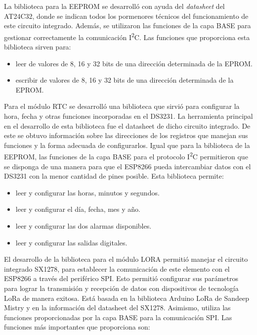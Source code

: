 La biblioteca para la EEPROM se desarrolló con ayuda del \textit{datasheet} \citep{WEBSITE:24} del AT24C32, donde se indican todos los pormenores técnicos del funcionamiento de este circuito integrado. Además, se utilizaron las funciones de la capa BASE para gestionar correctamente la comunicación I\textsuperscript{2}C. Las funciones que proporciona esta biblioteca sirven para:

\begin{itemize}
	\item leer de valores de 8, 16 y 32 bits de una dirección determinada de la EPROM.
	\item escribir de valores de 8, 16 y 32 bits de una dirección determinada de la EPROM.
\end{itemize}

Para el módulo RTC se desarrolló una biblioteca que sirvió para configurar la hora, fecha y otras funciones incorporadas en el DS3231. La herramienta principal en el desarrollo de esta biblioteca fue el datasheet \citep{WEBSITE:25} de dicho circuito integrado. De este se obtuvo información sobre las direcciones de los registros que manejan sus funciones y la forma adecuada de configurarlos. Igual que para la biblioteca de la EEPROM, las funciones de la capa BASE para el protocolo I\textsuperscript{2}C permitieron que se disponga de una manera para que el ESP8266 pueda intercambiar datos con el DS3231 con la menor cantidad de pines posible. Esta biblioteca permite:

\begin{itemize}
	\item leer y configurar las horas, minutos y segundos.
	\item leer y configurar el día, fecha, mes y año.
	\item leer y configurar las dos alarmas disponibles.
	\item leer y configurar las salidas digitales.
	
\end{itemize} 

El desarrollo de la biblioteca para el módulo LORA permitió manejar el circuito integrado SX1278, para establecer la comunicación de este elemento con el ESP8266 a través del periférico SPI. Esto permitió configurar sus parámetros para lograr la transmisión y recepción de datos con dispositivos de tecnología LoRa de manera exitosa. Está basada en la biblioteca Arduino LoRa de Sandeep Mistry \citep{WEBSITE:21} y en la información del datasheet \citep{WEBSITE:26} del SX1278. Asimismo, utiliza las funciones proporcionadas por la capa BASE para la comunicación SPI. Las funciones más importantes que proporciona son:

